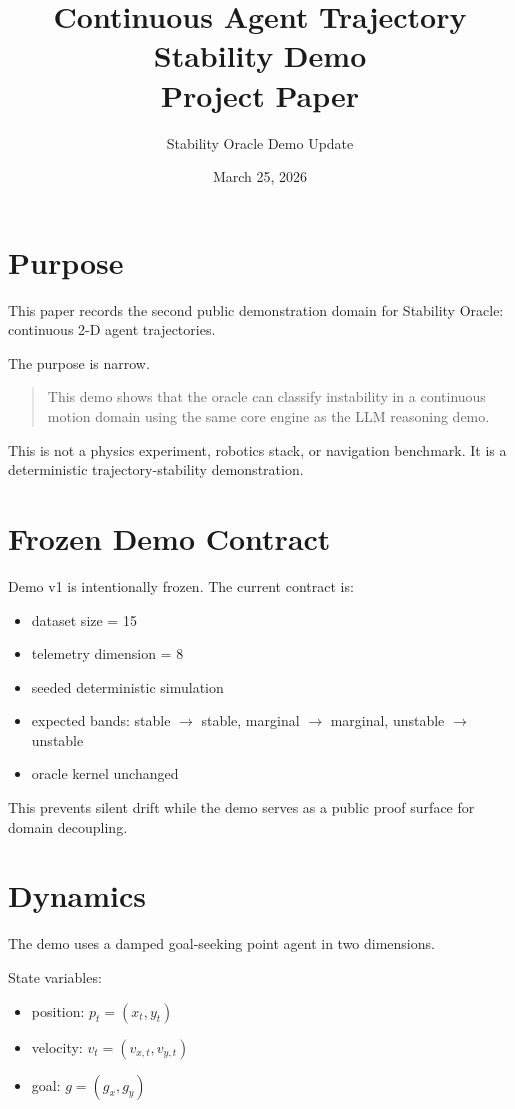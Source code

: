 \documentclass[11pt]{article}
\title{Continuous Agent Trajectory Stability Demo\\Project Paper}
\author{Stability Oracle Demo Update}
\date{March 25, 2026}
\begin{document}
\maketitle
\tableofcontents
\newpage

\section{Purpose}

This paper records the second public demonstration domain for Stability Oracle:
continuous 2-D agent trajectories.

The purpose is narrow.

\begin{quote}
This demo shows that the oracle can classify instability in a continuous motion domain using the same core engine as the LLM reasoning demo.
\end{quote}

This is not a physics experiment, robotics stack, or navigation benchmark.
It is a deterministic trajectory-stability demonstration.

\section{Frozen Demo Contract}

Demo v1 is intentionally frozen.
The current contract is:

\begin{itemize}
\item dataset size = 15
\item telemetry dimension = 8
\item seeded deterministic simulation
\item expected bands: stable $\rightarrow$ stable, marginal $\rightarrow$ marginal, unstable $\rightarrow$ unstable
\item oracle kernel unchanged
\end{itemize}

This prevents silent drift while the demo serves as a public proof surface for domain decoupling.

\section{Dynamics}

The demo uses a damped goal-seeking point agent in two dimensions.

State variables:

\begin{itemize}
\item position: $p_t = (x_t, y_t)$
\item velocity: $v_t = (v_{x,t}, v_{y,t})$
\item goal: $g = (g_x, g_y)$
\end{itemize}
\end{document}
